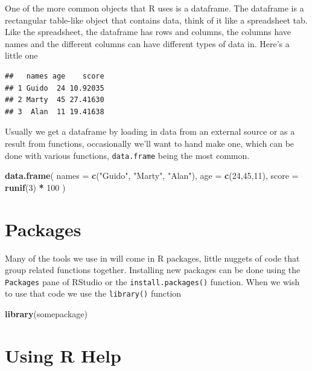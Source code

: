 \documentclass[
]{book}
\newenvironment{Shaded}{\begin{snugshade}}{\end{snugshade}}
\newcommand{\DataTypeTok}[1]{\textcolor[rgb]{0.13,0.29,0.53}{#1}}
\newcommand{\DecValTok}[1]{\textcolor[rgb]{0.00,0.00,0.81}{#1}}
\newcommand{\KeywordTok}[1]{\textcolor[rgb]{0.13,0.29,0.53}{\textbf{#1}}}
\newcommand{\NormalTok}[1]{#1}
\newcommand{\OperatorTok}[1]{\textcolor[rgb]{0.81,0.36,0.00}{\textbf{#1}}}
\newcommand{\StringTok}[1]{\textcolor[rgb]{0.31,0.60,0.02}{#1}}
\begin{document}
One of the more common objects that R uses is a dataframe. The dataframe is a rectangular table-like object that contains data, think of it like a spreadsheet tab. Like the spreadsheet, the dataframe has rows and columns, the columns have names and the different columns can have different types of data in. Here's a little one

\begin{verbatim}
##   names age    score
## 1 Guido  24 10.92035
## 2 Marty  45 27.41630
## 3  Alan  11 19.41638
\end{verbatim}

Usually we get a dataframe by loading in data from an external source or as a result from functions, occasionally we'll want to hand make one, which can be done with various functions, \texttt{data.frame} being the most common.

\begin{Shaded}
\begin{Highlighting}[]
\KeywordTok{data.frame}\NormalTok{(}
  \DataTypeTok{names =} \KeywordTok{c}\NormalTok{(}\StringTok{"Guido"}\NormalTok{, }\StringTok{"Marty"}\NormalTok{, }\StringTok{"Alan"}\NormalTok{),}
  \DataTypeTok{age =} \KeywordTok{c}\NormalTok{(}\DecValTok{24}\NormalTok{,}\DecValTok{45}\NormalTok{,}\DecValTok{11}\NormalTok{),}
  \DataTypeTok{score =} \KeywordTok{runif}\NormalTok{(}\DecValTok{3}\NormalTok{) }\OperatorTok{*}\StringTok{ }\DecValTok{100}
\NormalTok{)}
\end{Highlighting}
\end{Shaded}

\hypertarget{packages}{%
\section{Packages}\label{packages}}

Many of the tools we use in will come in R packages, little nuggets of code that group related functions together. Installing new packages can be done using the \texttt{Packages} pane of RStudio or the \texttt{install.packages()} function. When we wish to use that code we use the \texttt{library()} function

\begin{Shaded}
\begin{Highlighting}[]
\KeywordTok{library}\NormalTok{(somepackage)}
\end{Highlighting}
\end{Shaded}

\hypertarget{using-r-help}{%
\section{Using R Help}\label{using-r-help}}
\end{document}
